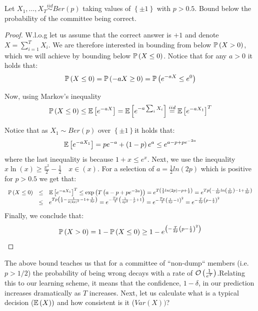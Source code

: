 \begin{exercise}
Let $X_1,\ldots,X_T\overset{iid}{\sim}Ber\left(p\right)$ taking values of $\left\{\pm1\right\}$ with $p>0.5$. Bound below the probability of the committee being correct.
\end{exercise}
\begin{proof}
W.l.o.g let us assume that the correct answer is $+1$ and denote $X=\sum_{i=1}^T X_i$. We are therefore interested in bounding from below $\mathbb{P}\left(X>0\right)$, which we will achieve by bounding below $\mathbb{P}\left(X\leq0\right)$. Notice that for any $a>0$ it holds that: $$ \mathbb{P}\left(X\leq 0\right)=\mathbb{P}\left(-aX\geq 0\right)=\mathbb{P}\left(e^{-aX}\leq e^0\right) $$

Now, using Markov's inequality $$ \mathbb{P}\left(X\leq 0\right) \leq \mathbb{E}\left[e^{-aX}\right]=\mathbb{E}\left[e^{-a\sum_i X_i}\right] \overset{iid}{=} \mathbb{E}\left[e^{-aX_1}\right]^T $$

Notice that as $X_1\sim Ber\left(p\right)$ over $\left\{\pm 1\right\}$it holds that: $$ \mathbb{E}\left[e^{-aX_1}\right] = pe^{-a} + \left(1-p\right)e^a \leq e^{a-p+pe^{-2a}}$$ where the last inequality is because $1+x\leq e^x$. Next, we use the inequality $x\ln\left(x\right)\geq \frac{x^2}{2}-\frac{1}{2}\quad x\in\left(x\right)$. For a selection of $a=\frac{1}{2}ln\left(2p\right)$ which is positive for $p>0.5$ we get that: 
$$
\begin{array}{ccl}
\mathbb{P}\left(X\leq0\right) & \leq & \mathbb{E}\left[e^{-aX_{1}}\right]^{T}\leq\exp\left(T\left(a-p+pe^{-2a}\right)\right)=e^{T\left(\frac{1}{2}ln\left(2p\right)-p+\frac{1}{2}\right)}=e^{Tp\left(-\frac{1}{2p}ln\left(\frac{1}{2p}\right)-1+\frac{1}{2p}\right)}\\
& \leq & e^{Tp\left(\frac{1}{2}-\frac{1}{2\left(2p\right)^{2}}-1+\frac{1}{2p}\right)}=e^{-\frac{Tp}{2}\left(\frac{1}{4p^{2}}-\frac{1}{p}+1\right)}=e^{-\frac{Tp}{2}\left(\frac{1}{2p}-1\right)^{2}}=e^{-\frac{T}{2p}\left(p-\frac{1}{2}\right)^{2}}
\end{array}
$$ Finally, we conclude that: $$\mathbb{P}\left(X>0\right) = 1-\mathbb{P}\left(X\leq 0\right) \geq 1-e^{\left(-\frac{T}{2p}\left(p-\frac{1}{2}\right)^2\right)}$$
\end{proof}


The above bound teaches us that for a committee of ``non-dump`` members (i.e. $p>1/2$) the probability of being wrong decays with a rate of $\mathcal{O}\left(\frac{1}{e^T}\right)$.Relating this to our learning scheme, it means that the confidence, $1-\delta$,  in our prediction increases dramatically as $T$ increases. Next, let us calculate what is a typical decision ($\mathbb{E}\left(X\right))$ and how consistent is it ($Var\left(X\right))$?

